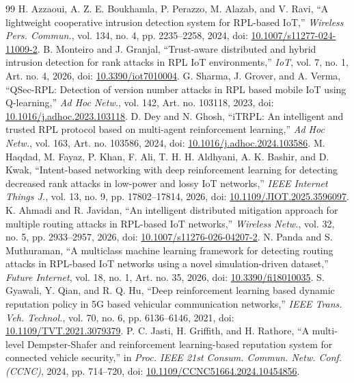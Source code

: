 \begin{thebibliography}{99}
 H. Azzaoui, A. Z. E. Boukhamla, P. Perazzo, M. Alazab, and V. Ravi, ``A lightweight cooperative intrusion detection system for RPL-based IoT,'' \emph{Wireless Pers. Commun.}, vol. 134, no. 4, pp. 2235--2258, 2024, doi: \href{https://doi.org/10.1007/s11277-024-11009-2}{10.1007/s11277-024-11009-2}.
 B. Monteiro and J. Granjal, ``Trust-aware distributed and hybrid intrusion detection for rank attacks in RPL IoT environments,'' \emph{IoT}, vol. 7, no. 1, Art. no. 4, 2026, doi: \href{https://doi.org/10.3390/iot7010004}{10.3390/iot7010004}.
 G. Sharma, J. Grover, and A. Verma, ``QSec-RPL: Detection of version number attacks in RPL based mobile IoT using Q-learning,'' \emph{Ad Hoc Netw.}, vol. 142, Art. no. 103118, 2023, doi: \href{https://doi.org/10.1016/j.adhoc.2023.103118}{10.1016/j.adhoc.2023.103118}.
 D. Dey and N. Ghosh, ``iTRPL: An intelligent and trusted RPL protocol based on multi-agent reinforcement learning,'' \emph{Ad Hoc Netw.}, vol. 163, Art. no. 103586, 2024, doi: \href{https://doi.org/10.1016/j.adhoc.2024.103586}{10.1016/j.adhoc.2024.103586}.
 M. Haqdad, M. Fayaz, P. Khan, F. Ali, T. H. H. Aldhyani, A. K. Bashir, and D. Kwak, ``Intent-based networking with deep reinforcement learning for detecting decreased rank attacks in low-power and lossy IoT networks,'' \emph{IEEE Internet Things J.}, vol. 13, no. 9, pp. 17802--17814, 2026, doi: \href{https://doi.org/10.1109/JIOT.2025.3596097}{10.1109/JIOT.2025.3596097}.
 K. Ahmadi and R. Javidan, ``An intelligent distributed mitigation approach for multiple routing attacks in RPL-based IoT networks,'' \emph{Wireless Netw.}, vol. 32, no. 5, pp. 2933--2957, 2026, doi: \href{https://doi.org/10.1007/s11276-026-04207-2}{10.1007/s11276-026-04207-2}.
 N. Panda and S. Muthuraman, ``A multiclass machine learning framework for detecting routing attacks in RPL-based IoT networks using a novel simulation-driven dataset,'' \emph{Future Internet}, vol. 18, no. 1, Art. no. 35, 2026, doi: \href{https://doi.org/10.3390/fi18010035}{10.3390/fi18010035}.
 S. Gyawali, Y. Qian, and R. Q. Hu, ``Deep reinforcement learning based dynamic reputation policy in 5G based vehicular communication networks,'' \emph{IEEE Trans. Veh. Technol.}, vol. 70, no. 6, pp. 6136--6146, 2021, doi: \href{https://doi.org/10.1109/TVT.2021.3079379}{10.1109/TVT.2021.3079379}.
 P. C. Jasti, H. Griffith, and H. Rathore, ``A multi-level Dempster-Shafer and reinforcement learning-based reputation system for connected vehicle security,'' in \emph{Proc. IEEE 21st Consum. Commun. Netw. Conf. (CCNC)}, 2024, pp. 714--720, doi: \href{https://doi.org/10.1109/CCNC51664.2024.10454856}{10.1109/CCNC51664.2024.10454856}.

\end{thebibliography}
